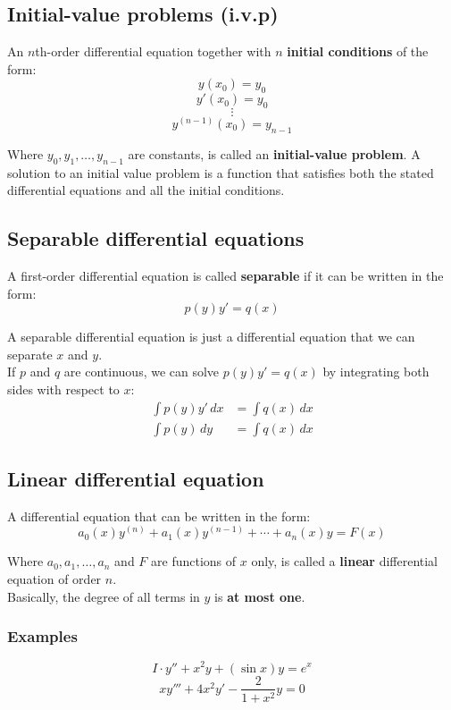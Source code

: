 \documentclass[11pt]{article}
\begin{document}
\newpage

\subsection{Initial-value problems (i.v.p)}
\label{sec:org4998b18}
An \(n\)th-order differential equation together with \(n\) \textbf{initial conditions} of the form:
\[y(x_0) = y_0\]
\[y'(x_0) = y_0\]
\[\vdots\]
\[y^{(n - 1)}(x_0) = y_{n - 1}\]

Where \(y_0, y_1, \ldots, y_{n-1}\) are constants, is called an \textbf{initial-value problem}. A solution to an initial value problem is a function that satisfies both the stated differential equations and all the initial conditions.

\subsection{Separable differential equations}
\label{sec:org7f741d5}
A first-order differential equation is called \textbf{separable} if it can be written in the form:
\[p(y) y' = q(x)\]

A separable differential equation is just a differential equation that we can separate \(x\) and \(y\).
\\[0pt]

If \(p\) and \(q\) are continuous, we can solve \(p(y) y' = q(x)\) by integrating both sides with respect to \(x\):
\begin{align*}
\int p(y) y' \, dx &= \int q(x) \, dx \\
\int p(y) \, dy &= \int q(x) \, dx
\end{align*}

\newpage

\subsection{Linear differential equation}
\label{sec:org2409a2e}
A differential equation that can be written in the form:
\[a_0 (x) y^{(n)} + a_1 (x) y^{(n - 1)} + \cdots + a_n (x) y = F(x)\]

Where \(a_0, a_1, \ldots, a_n\) and \(F\) are functions of \(x\) only, is called a \textbf{linear} differential equation of order \(n\).
\\[0pt]

Basically, the degree of all terms in \(y\) is \textbf{at most one}.

\subsubsection{Examples}
\label{sec:org790f482}
\[I \cdot y'' + x^2 y + (\sin x) y = e^x \tag{1}\]
\[xy''' + 4x^2 y' - \frac{2}{1+ x^2} y = 0 \tag{2}\]
\end{document}
